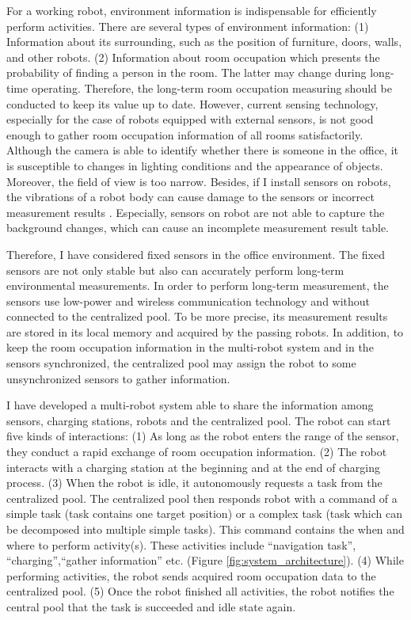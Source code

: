 For a working robot, environment information is indispensable for efficiently perform activities. There are several types of environment information: (1) Information about its surrounding, such as the position of furniture, doors, walls, and other robots. (2) Information about room occupation which presents the probability of finding a person in the room. The latter may change during long-time operating. Therefore, the long-term room occupation measuring should be conducted to keep its value up to date.
However, current sensing technology, especially for the case of robots equipped with external sensors, is not good enough to gather room occupation information of all rooms satisfactorily. 
Although the camera is able to identify whether there is someone in the office, it is susceptible to changes in lighting conditions and the appearance of objects. Moreover, the field of view is too narrow. Besides, if I install sensors on robots, the vibrations of a robot body can cause damage to the sensors or incorrect measurement results \cite{PYO2015148}. Especially, sensors on robot are not able to capture the background changes, which can cause an incomplete measurement result table.

Therefore, I have considered fixed sensors in the office environment. The fixed sensors are not only stable but also can accurately perform long-term environmental measurements. In order to perform long-term measurement, the sensors use low-power and wireless communication technology and without connected to the centralized pool. To be more precise, its measurement results are stored in its local memory and acquired by the passing robots. In addition, to keep the room occupation information in the multi-robot system and in the sensors synchronized, the centralized pool may assign the robot to some unsynchronized sensors to gather information.

I have developed a multi-robot system able to share the information among sensors, charging stations, robots and the centralized pool. The robot can start five kinds of interactions: 
(1) As long as the robot enters the range of the sensor, they conduct a rapid exchange of room occupation information. 
(2) The robot interacts with a charging station at the beginning and at the end of charging process. 
(3) When the robot is idle, it autonomously requests a task from the centralized pool. The centralized pool then responds robot with a command of a simple task (task contains one target position) or a complex task (task which can be decomposed into multiple simple tasks). This command contains the when and where to perform activity(s). These activities include ``navigation task'', ``charging'',``gather information'' etc. (Figure \ref{fig:system_architecture}).
(4) While performing activities, the robot sends acquired room occupation data to the centralized pool. 
(5) Once the robot finished all activities, the robot notifies the central pool that the task is succeeded and idle state again.


